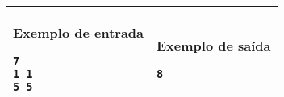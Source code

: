 \begin{table}[!h]  
\centering  
\begin{tabular}{|l|l|}  
\hline  
\begin{minipage}[t]{3in}  
\textbf{Exemplo de entrada}  
\begin{verbatim}  
7  
1 1  
5 5  
\end{verbatim}  
\vspace{1mm}
\end{minipage}  
&  
\begin{minipage}[t]{3in}  
\textbf{Exemplo de saída}  
\begin{verbatim}  
8  
\end{verbatim}  
\vspace{1mm}
\end{minipage} \\  
\hline  
\end{tabular}  
\end{table}
